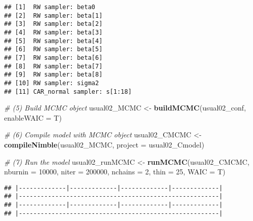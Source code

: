 \documentclass[]{article}
\newenvironment{Shaded}{\begin{snugshade}}{\end{snugshade}}
\newcommand{\CommentTok}[1]{\textcolor[rgb]{0.56,0.35,0.01}{\textit{#1}}}
\newcommand{\DataTypeTok}[1]{\textcolor[rgb]{0.13,0.29,0.53}{#1}}
\newcommand{\DecValTok}[1]{\textcolor[rgb]{0.00,0.00,0.81}{#1}}
\newcommand{\KeywordTok}[1]{\textcolor[rgb]{0.13,0.29,0.53}{\textbf{#1}}}
\newcommand{\NormalTok}[1]{#1}
\newcommand{\OperatorTok}[1]{\textcolor[rgb]{0.81,0.36,0.00}{\textbf{#1}}}
\newcommand{\StringTok}[1]{\textcolor[rgb]{0.31,0.60,0.02}{#1}}
\begin{document}
\begin{Shaded}
\end{Shaded}

\begin{verbatim}
## [1]  RW sampler: beta0
## [2]  RW sampler: beta[1]
## [3]  RW sampler: beta[2]
## [4]  RW sampler: beta[3]
## [5]  RW sampler: beta[4]
## [6]  RW sampler: beta[5]
## [7]  RW sampler: beta[6]
## [8]  RW sampler: beta[7]
## [9]  RW sampler: beta[8]
## [10] RW sampler: sigma2
## [11] CAR_normal sampler: s[1:18]
\end{verbatim}

\begin{Shaded}
\begin{Highlighting}[]
\CommentTok{# (5) Build MCMC object}
\NormalTok{usual02_MCMC <-}\StringTok{ }\KeywordTok{buildMCMC}\NormalTok{(usual02_conf, }\DataTypeTok{enableWAIC =}\NormalTok{ T) }

\CommentTok{# (6) Compile model with MCMC object}
\NormalTok{usual02_CMCMC <-}\StringTok{ }\KeywordTok{compileNimble}\NormalTok{(usual02_MCMC, }\DataTypeTok{project =}\NormalTok{ usual02_Cmodel)  }

\CommentTok{# (7) Run the model}
\NormalTok{usual02_runMCMC <-}\StringTok{ }\KeywordTok{runMCMC}\NormalTok{(usual02_CMCMC, }\DataTypeTok{nburnin =} \DecValTok{10000}\NormalTok{, }\DataTypeTok{niter =} \DecValTok{200000}\NormalTok{, }\DataTypeTok{nchains =} \DecValTok{2}\NormalTok{, }\DataTypeTok{thin =} \DecValTok{25}\NormalTok{, }\DataTypeTok{WAIC =}\NormalTok{ T)}
\end{Highlighting}
\end{Shaded}

\begin{verbatim}
## |-------------|-------------|-------------|-------------|
## |-------------------------------------------------------|
## |-------------|-------------|-------------|-------------|
## |-------------------------------------------------------|
\end{verbatim}
\end{document}
